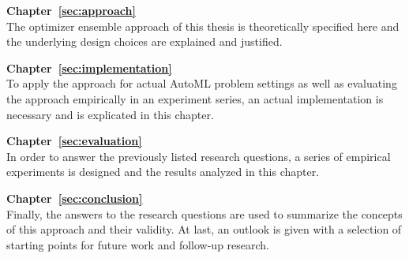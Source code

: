 \textbf{Chapter~\ref{sec:approach}} \\[0.2em]
The optimizer ensemble approach of this thesis is theoretically specified here and the underlying design choices are explained and justified.

\textbf{Chapter~\ref{sec:implementation}} \\[0.2em]
To apply the approach for actual AutoML problem settings as well as evaluating the approach empirically in an experiment series, an actual implementation is necessary and is explicated in this chapter.

\textbf{Chapter~\ref{sec:evaluation}} \\[0.2em]
In order to answer the previously listed research questions, a series of empirical experiments is designed and the results analyzed in this chapter.

\textbf{Chapter~\ref{sec:conclusion}} \\[0.2em]
Finally, the answers to the research questions are used to summarize the concepts of this approach and their validity.
At last, an outlook is given with a selection of starting points for future work and follow-up research.
